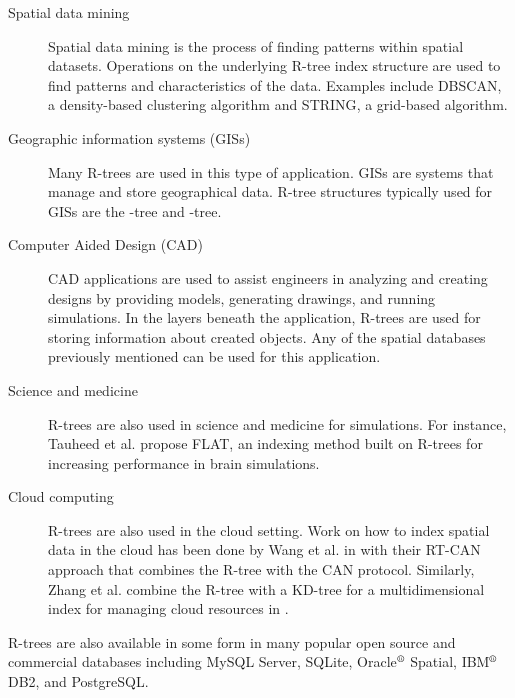 \begin{description}
	\item[Spatial data mining] Spatial data mining is the process of finding
	patterns within spatial datasets. Operations on the underlying R-tree 
	index structure are used to find patterns and characteristics of the 
	data. Examples include DBSCAN\cite{ester1996density}, a density-based 
	clustering algorithm and STRING\cite{wang1997sting}, a grid-based 
	algorithm. 
	\item[Geographic information systems (GISs)] Many R-trees are used in 
	this type of application. GISs are systems that manage and store 
	geographical data. R-tree structures typically used for GISs are the 
	\rbase-tree\cite{guttman84} and \rstar-tree\cite{beckmannkriegelschneiderseeger90}.
	\item[Computer Aided Design (CAD)] CAD applications are used to assist
	engineers in analyzing and creating designs by providing models, 
	generating drawings, and running simulations. In the layers beneath the
	application, R-trees are used for storing information about created 
	objects. Any of the spatial databases previously mentioned can be used 
	for this application. 
	\item[Science and medicine] R-trees are also used in science and 
	medicine for simulations. For instance, Tauheed et al. propose FLAT, an 
	indexing method built on R-trees for increasing performance in brain 
	simulations\cite{tauheed2012accelerating}.
	\item[Cloud computing] R-trees are also used in the cloud setting. Work
	on how to index spatial data in the cloud has been done by Wang et al. in
	 \cite{wang2009retrieving} with their RT-CAN approach that combines the 
	R-tree with the CAN protocol. Similarly, Zhang et al. combine the R-tree
	with a KD-tree for a multidimensional index for managing cloud resources 
	in \cite{zhang2009efficient}.
\end{description}

R-trees are also available in some form in many popular open source and 
commercial databases including MySQL Server, SQLite, Oracle$\textsuperscript{\textregistered}$ Spatial, IBM$\textsuperscript{\textregistered}$ DB2, and 
PostgreSQL. 


